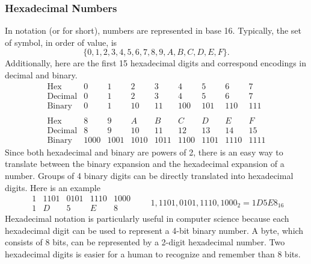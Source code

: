 \subsubsection*{Hexadecimal Numbers}
In  notation (or  for short), numbers are represented in base 16. Typically, the set of symbol, in order of value, is
\[
    \{0,1,2,3,4,5,6,7,8,9,A,B,C,D,E,F\}.
\]
Additionally, here are the first 15 hexadecimal digits and correspond encodings in decimal and binary.
\[
    \begin{array}{lccccccccc}
        \text{Hex}     & 0    & 1    & 2    & 3    & 4    & 5    & 6    & 7    \\
        \text{Decimal} & 0    & 1    & 2    & 3    & 4    & 5    & 6    & 7    \\
        \text{Binary}  & 0    & 1    & 10   & 11   & 100  & 101  & 110  & 111  \\ \\
        \text{Hex}     & 8    & 9    & A    & B    & C    & D    & E    & F    \\
        \text{Decimal} & 8    & 9    & 10   & 11   & 12   & 13   & 14   & 15   \\
        \text{Binary}  & 1000 & 1001 & 1010 & 1011 & 1100 & 1101 & 1110 & 1111
    \end{array}
\]
Since both hexadecimal and binary are powers of 2, there is an easy way to translate between the binary expansion and the hexadecimal expansion of a number. Groups of 4 binary digits can be directly translated into hexadecimal digits. Here is an example
\[
    \begin{array}{ccccc}
        1 & 1101 & 0101 & 1110 & 1000 \\
        1 & D    & 5    & E    & 8
    \end{array} \qquad 1,1101,0101,1110,1000_2 = 1D5E8_{16}
\]
Hexadecimal notation is particularly useful in computer science because each hexadecimal digit can be used to represent a 4-bit binary number. A byte, which consists of 8 bits, can be represented by a 2-digit hexadecimal number. Two hexadecimal digits is easier for a human to recognize and remember than 8 bits.

